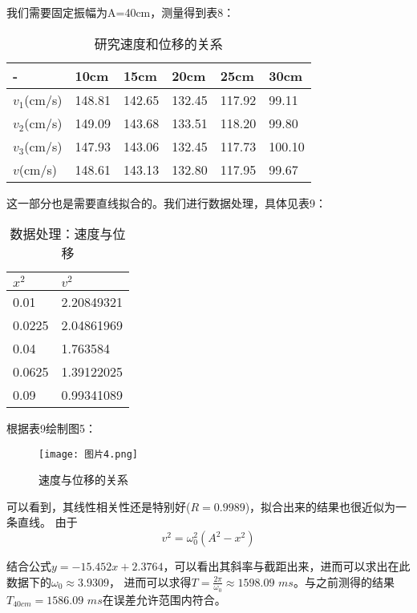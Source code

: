 \documentclass[11pt]{article}
\begin{document}
我们需要固定振幅为A=40cm，测量得到表8：

\begin{table}[!ht]
    \centering
    \begin{tabular}{|l|l|l|l|l|l|}
    \hline
        - & 10cm & 15cm & 20cm & 25cm & 30cm \\ \hline
        $v_1$(cm/s) & 148.81 & 142.65 & 132.45 & 117.92 & 99.11 \\ \hline
        $v_2$(cm/s) & 149.09 & 143.68 & 133.51 & 118.20 & 99.80 \\ \hline
        $v_3$(cm/s) & 147.93 & 143.06 & 132.45 & 117.73 & 100.10 \\ \hline
        $v$(cm/s) & 148.61 & 143.13 & 132.80 & 117.95 & 99.67 \\ \hline
    \end{tabular}
    \caption{研究速度和位移的关系}
\end{table}

这一部分也是需要直线拟合的。我们进行数据处理，具体见表9：

\begin{table}[!ht]
    \centering
    \begin{tabular}{|l|l|}
    \hline
        $x^2$ & $v^2$ \\ \hline
        0.01 & 2.20849321 \\ \hline
        0.0225 & 2.04861969 \\ \hline
        0.04 & 1.763584 \\ \hline
        0.0625 & 1.39122025 \\ \hline
        0.09 & 0.99341089 \\ \hline
    \end{tabular}
    \caption{数据处理：速度与位移}
\end{table}

根据表9绘制图5：

\begin{figure}[htbp]
    \centering
    \texttt{[image: 图片4.png]}
    \caption{速度与位移的关系}
\end{figure}

可以看到，其线性相关性还是特别好($R=0.9989$)，拟合出来的结果也很近似为一条直线。
由于\[v^2=\omega_0^2(A^2-x^2)\]

结合公式$y=-15.452x+2.3764$，可以看出其斜率与截距出来，进而可以求出在此数据下的$\omega_0\approx 3.9309$，
进而可以求得$\displaystyle T=\frac{2\pi}{\omega_0}\approx 1598.09\,\,ms$。与之前测得的结果$T_{40cm}=1586.09\,\, ms$在误差允许范围内符合。
\end{document}
